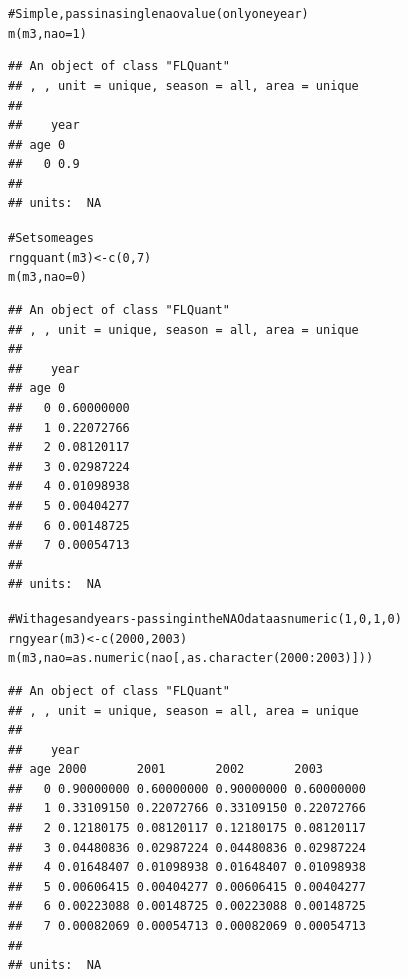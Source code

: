 \documentclass[a4paper,english,10pt]{article}\usepackage[]{graphicx}\usepackage[]{color}
\makeatletter
\newcommand{\hlnum}[1]{\textcolor[rgb]{0.2,0.2,0.2}{#1}}%
\newcommand{\hlcom}[1]{\textcolor[rgb]{0.2,0.267,0.4}{#1}}%
\newcommand{\hlopt}[1]{\textcolor[rgb]{0.2,0.2,0.2}{#1}}%
\newcommand{\hlstd}[1]{\textcolor[rgb]{0,0,0}{#1}}%
\newcommand{\hlkwb}[1]{\textcolor[rgb]{0.361,0.506,0.596}{#1}}%
\newcommand{\hlkwc}[1]{\textcolor[rgb]{0.361,0.506,0.596}{#1}}%
\newcommand{\hlkwd}[1]{\textcolor[rgb]{0.361,0.506,0.596}{#1}}%
\newenvironment{kframe}{%
 \def\at@end@of@kframe{}%
 \ifinner\ifhmode%
  \def\at@end@of@kframe{\end{minipage}}%
  \begin{minipage}{\columnwidth}%
 \fi\fi%
 \def\FrameCommand##1{\hskip\@totalleftmargin \hskip-\fboxsep
 \colorbox{shadecolor}{##1}\hskip-\fboxsep
     \hskip-\linewidth \hskip-\@totalleftmargin \hskip\columnwidth}%
 \MakeFramed {\advance\hsize-\width
   \@totalleftmargin\z@ \linewidth\hsize
   \@setminipage}}%
 {\par\unskip\endMakeFramed%
 \at@end@of@kframe}
\newenvironment{knitrout}{}{} %
\makeatother
\begin{document}
\begin{knitrout}
\color{fgcolor}\begin{kframe}
\begin{alltt}
\hlcom{# Simple, pass in a single nao value (only one year)}
\hlkwd{m}\hlstd{(m3,} \hlkwc{nao} \hlstd{=} \hlnum{1}\hlstd{)}
\end{alltt}
\begin{verbatim}
## An object of class "FLQuant"
## , , unit = unique, season = all, area = unique
## 
##    year
## age 0  
##   0 0.9
## 
## units:  NA
\end{verbatim}
\begin{alltt}
\hlcom{# Set some ages}
\hlkwd{rngquant}\hlstd{(m3)} \hlkwb{<-} \hlkwd{c}\hlstd{(}\hlnum{0}\hlstd{,} \hlnum{7}\hlstd{)}
\hlkwd{m}\hlstd{(m3,} \hlkwc{nao} \hlstd{=} \hlnum{0}\hlstd{)}
\end{alltt}
\begin{verbatim}
## An object of class "FLQuant"
## , , unit = unique, season = all, area = unique
## 
##    year
## age 0         
##   0 0.60000000
##   1 0.22072766
##   2 0.08120117
##   3 0.02987224
##   4 0.01098938
##   5 0.00404277
##   6 0.00148725
##   7 0.00054713
## 
## units:  NA
\end{verbatim}
\begin{alltt}
\hlcom{# With ages and years - passing in the NAO data as numeric (1,0,1,0)}
\hlkwd{rngyear}\hlstd{(m3)} \hlkwb{<-} \hlkwd{c}\hlstd{(}\hlnum{2000}\hlstd{,} \hlnum{2003}\hlstd{)}
\hlkwd{m}\hlstd{(m3,} \hlkwc{nao} \hlstd{=} \hlkwd{as.numeric}\hlstd{(nao[,} \hlkwd{as.character}\hlstd{(}\hlnum{2000}\hlopt{:}\hlnum{2003}\hlstd{)]))}
\end{alltt}
\begin{verbatim}
## An object of class "FLQuant"
## , , unit = unique, season = all, area = unique
## 
##    year
## age 2000       2001       2002       2003      
##   0 0.90000000 0.60000000 0.90000000 0.60000000
##   1 0.33109150 0.22072766 0.33109150 0.22072766
##   2 0.12180175 0.08120117 0.12180175 0.08120117
##   3 0.04480836 0.02987224 0.04480836 0.02987224
##   4 0.01648407 0.01098938 0.01648407 0.01098938
##   5 0.00606415 0.00404277 0.00606415 0.00404277
##   6 0.00223088 0.00148725 0.00223088 0.00148725
##   7 0.00082069 0.00054713 0.00082069 0.00054713
## 
## units:  NA
\end{verbatim}
\end{kframe}
\end{knitrout}
\end{document}
